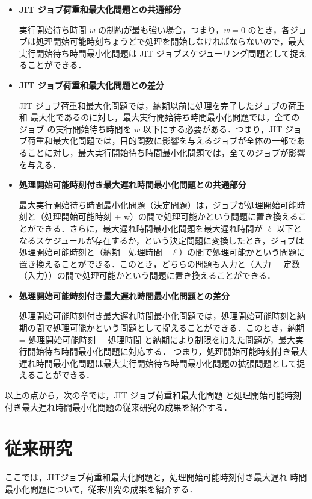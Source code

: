 \documentclass[12pt]{optlab-bachelor}
\begin{document}
\begin{itemize}
  \item \textbf{JIT ジョブ荷重和最大化問題との共通部分}

  実行開始待ち時間 $w$ の制約が最も強い場合，つまり，$w = 0$ のとき，各ジョブは処理開始可能時刻ちょうどで処理を開始しなければならないので，最大実行開始待ち時間最小化問題は JIT ジョブスケジューリング問題として捉えることができる．

  \item \textbf{JIT ジョブ荷重和最大化問題との差分}

  JIT ジョブ荷重和最大化問題では，納期以前に処理を完了したジョブの荷重和
  最大化であるのに対し，最大実行開始待ち時間最小化問題では，全てのジョブ
  の実行開始待ち時間を $w$ 以下にする必要がある．つまり，JIT ジョブ荷重和最大化問題では，目的関数に影響を与えるジョブが全体の一部であることに対し，最大実行開始待ち時間最小化問題では，全てのジョブが影響を与える．

  \item \textbf{処理開始可能時刻付き最大遅れ時間最小化問題との共通部分}

  最大実行開始待ち時間最小化問題（決定問題）は，ジョブが処理開始可能時刻と（処理開始可能時刻 + w）の間で処理可能かという問題に置き換えることができる．さらに，最大遅れ時間最小化問題を最大遅れ時間が $\ell$ 以下となるスケジュールが存在するか，という決定問題に変換したとき，ジョブは処理開始可能時刻と（納期 - 処理時間 - $\ell$）の間で処理可能かという問題に置き換えることができる．このとき，どちらの問題も入力と（入力 + 定数（入力））の間で処理可能かという問題に置き換えることができる．

  \item \textbf{処理開始可能時刻付き最大遅れ時間最小化問題との差分}

  処理開始可能時刻付き最大遅れ時間最小化問題では，処理開始可能時刻と納期の間で処理可能かという問題として捉えることができる．このとき，納期 = 処理開始可能時刻 + 処理時間 と納期により制限を加えた問題が，最大実行開始待ち時間最小化問題に対応する．
  つまり，処理開始可能時刻付き最大遅れ時間最小化問題は最大実行開始待ち時間最小化問題の拡張問題として捉えることができる．

\end{itemize}

以上の点から，次の章では，JIT ジョブ荷重和最大化問題
と処理開始可能時刻付き最大遅れ時間最小化問題の従来研究の成果を紹介する．

\chapter{従来研究}\label{c_3}
ここでは，JITジョブ荷重和最大化問題と，処理開始可能時刻付き最大遅れ
時間最小化問題について，従来研究の成果を紹介する．
\end{document}
